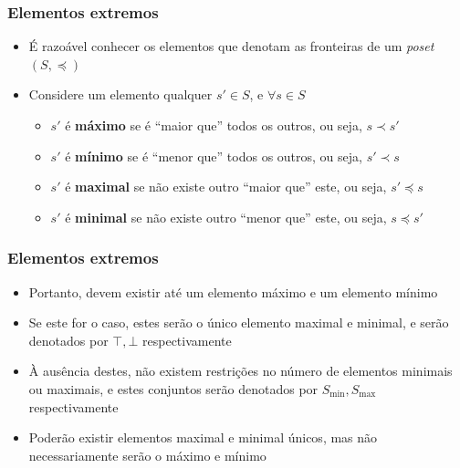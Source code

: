 \documentclass[12pt]{beamer}
\begin{document}
\begin{frame}
  \frametitle{Elementos extremos}
  \begin{itemize}
    \item<1-> É razoável conhecer os elementos que denotam as fronteiras de um
        \emph{poset} $(S, \preccurlyeq)$
    \item Considere um elemento qualquer $s' \in S$, e $\forall s \in S$
    \begin{itemize}[itemsep=0pt]
      \item<2-> $s'$ é \textbf{máximo} se é ``maior que'' todos os outros, ou
          seja, $s \prec s'$
      \item<3-> $s'$ é \textbf{mínimo} se é ``menor que'' todos os outros, ou
          seja, $s' \prec s$
      \item<4-> $s'$ é \textbf{maximal} se não existe outro ``maior que'' este,
          ou seja, $s' \preccurlyeq s$
      \item<5-> $s'$ é \textbf{minimal} se não existe outro ``menor que'' este,
          ou seja, $s \preccurlyeq s'$
    \end{itemize}
  \end{itemize}
\end{frame}

\begin{frame}
  \frametitle{Elementos extremos}
  \begin{itemize}
    \item Portanto, devem existir até um elemento máximo e um elemento mínimo
    \item Se este for o caso, estes serão o único elemento maximal e minimal, e
        serão denotados por $\top, \bot$ respectivamente
    \item À ausência destes, não existem restrições no número de elementos
        minimais ou maximais, e estes conjuntos serão denotados por $S_{\min},
          S_{\max}$ respectivamente
    \item Poderão existir elementos maximal e minimal únicos, mas não
        necessariamente serão o máximo e mínimo
  \end{itemize}
\end{frame}
\end{document}

